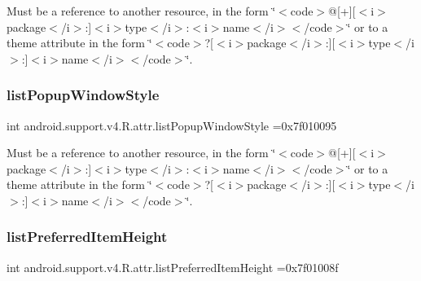 Must be a reference to another resource, in the form \char`\"{}$<$code$>$@\mbox{[}+\mbox{]}\mbox{[}$<$i$>$package$<$/i$>$\+:\mbox{]}$<$i$>$type$<$/i$>$\+:$<$i$>$name$<$/i$>$$<$/code$>$\char`\"{} or to a theme attribute in the form \char`\"{}$<$code$>$?\mbox{[}$<$i$>$package$<$/i$>$\+:\mbox{]}\mbox{[}$<$i$>$type$<$/i$>$\+:\mbox{]}$<$i$>$name$<$/i$>$$<$/code$>$\char`\"{}. \mbox{\label{classandroid_1_1support_1_1v4_1_1R_1_1attr_a88bbcdcadb337104abf92ae2375b91a4}} 
\subsubsection{\texorpdfstring{list\+Popup\+Window\+Style}{listPopupWindowStyle}}
{\footnotesize\ttfamily int android.\+support.\+v4.\+R.\+attr.\+list\+Popup\+Window\+Style =0x7f010095\hspace{0.3cm}{\ttfamily [static]}}

Must be a reference to another resource, in the form \char`\"{}$<$code$>$@\mbox{[}+\mbox{]}\mbox{[}$<$i$>$package$<$/i$>$\+:\mbox{]}$<$i$>$type$<$/i$>$\+:$<$i$>$name$<$/i$>$$<$/code$>$\char`\"{} or to a theme attribute in the form \char`\"{}$<$code$>$?\mbox{[}$<$i$>$package$<$/i$>$\+:\mbox{]}\mbox{[}$<$i$>$type$<$/i$>$\+:\mbox{]}$<$i$>$name$<$/i$>$$<$/code$>$\char`\"{}. \mbox{\label{classandroid_1_1support_1_1v4_1_1R_1_1attr_abbfb3f850012a18672cf64597dc0b519}} 
\subsubsection{\texorpdfstring{list\+Preferred\+Item\+Height}{listPreferredItemHeight}}
{\footnotesize\ttfamily int android.\+support.\+v4.\+R.\+attr.\+list\+Preferred\+Item\+Height =0x7f01008f\hspace{0.3cm}{\ttfamily [static]}}

